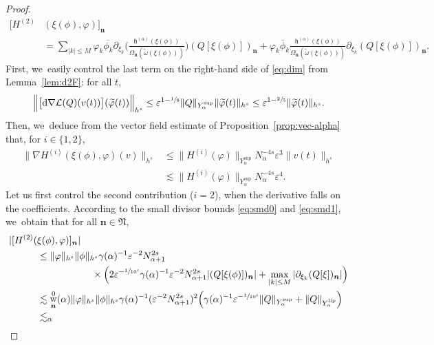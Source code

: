 \documentclass[10pt,a4paper]{amsart}
\DeclareMathOperator{\rw}{w}
\theoremstyle{plain}
\theoremstyle{definition}
\newcommand{\nb}{{\boldsymbol n}}
\newcommand{\Nb}{{\boldsymbol{\mathfrak{N}}}}
\newcommand{\1}{\mathbf{1}}
\newcommand{\Ysup}[1]{Y_{#1}^{\mathrm{sup}}}
\newcommand{\Ylip}[1]{Y_{#1}^{\mathrm{lip}}}
\let\epsilon\varepsilon
\begin{document}
\begin{proof}
\begin{equation*}
\begin{split}
[H^{(2)}&(\xi(\phi),\varphi)]_{\nb} \\
&=
\sum_{|k|\leq M}
\varphi_{k}\overline{\phi_{k}}
\partial_{\xi_{k}}
\Big(
\frac{\mathfrak{h}^{(\alpha)}(\xi(\phi))}
{\Omega_{\nb}(\widetilde{\omega}(\xi(\phi)))}
\Big)
(Q[\xi(\phi)])_{\nb}
+
\varphi_{k}\overline{\phi}_{k}
\frac{\mathfrak{h}^{(\alpha)}(\xi(\phi))}
{\Omega_{\nb}(\widetilde{\omega}(\xi(\phi)))}\partial_{\xi_{k}}
(Q[\xi(\phi)])_{\nb}.
\end{split}
\end{equation*}
First, we~easily control the last term on the right-hand side of \eqref{eq:dim} from Lemma~\ref{lem:d2F}: for all $t$,
\[
\Big\|\big[\mathrm{d}\nabla\mathcal{L}(Q)(v(t))\big](\widetilde{\varphi}(t))\Big \|_{h^{s}}
\leq
\epsilon^{1-\sfrac{1}{8}}
\|Q\|_{\Ysup{\alpha}}
\|\widetilde{\varphi}(t)\|_{h^{s}}
\leq
\epsilon^{1-\sfrac{2}{5}}
\|\widetilde{\varphi}(t)\|_{h^{s}}.
\]
Then, we~deduce from the vector field estimate of Proposition~\ref{prop:vec-alpha} that, for $i\in\{1,2\}$,
\begin{equation}
\label{eq:aprem}
\begin{split}
\| \nabla H^{(i)}(\xi(\phi),\varphi)(v)\|_{h^{s}}
&\leq
\|
H^{(i)}(\varphi)
\|_{\Ysup{\alpha}}
N_{\alpha}^{-4s}\epsilon^{3}\|v(t)\|_{h^{s}}\\
&\lesssim
\|
H^{(i)}(\varphi)
\|_{\Ysup{\alpha}}
N_{\alpha}^{-4s}\epsilon^{4}.
\end{split}
\end{equation}
Let us first control the second contribution ($i=2$), when the derivative falls on the coefficients. According to the small divisor bounds \eqref{eq:smd0} and \eqref{eq:smd1}, we~obtain that for all $\nb\in\Nb$,\vspace*{-3pt}
\begin{align*}
|[H^{(2)}(&\xi(\phi),\varphi)]_{\nb}|
\\
&\leq
\|\varphi\|_{h^{s}}\|\phi\|_{h^{s}}
\gamma(\alpha)^{-1}\epsilon^{-2}N_{\alpha+1}^{2s}
\\
&\hspace*{2cm}\times \Big(
2\epsilon^{-\sfrac{1}{10^{4}}}
\gamma(\alpha)^{-1}\epsilon^{-2}N_{\alpha+1}^{2s}
|(Q[\xi(\phi)])_{\nb}|
+
\max_{|k|\leq M}|\partial_{\xi_{k}}(Q[\xi])_{\nb}|
\Big) \\
&\lesssim
\rw_{\nb}^{0}(\alpha)
\|\varphi\|_{h^{s}}\|\phi\|_{h^{s}}
\gamma(\alpha)^{-1}(\epsilon^{-2}N_{\alpha+1}^{2s})^{2}
\Big(
\gamma(\alpha)^{-1}\epsilon^{-\sfrac{1}{10^{4}}}\|Q\|_{\Ysup{\alpha}}
+
\|Q\|_{\Ylip{\alpha}}
\Big)
\\
&\lesssim_{\alpha}

\end{align*}
\end{proof}
\end{document}
